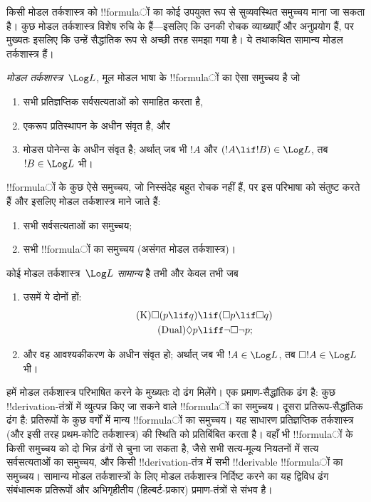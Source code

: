 \documentclass[../../../include/open-logic-section]{subfiles}
\begin{document}


किसी मोडल तर्कशास्त्र को !!{formula}ों का कोई उपयुक्त रूप से सुव्यवस्थित
समुच्चय माना जा सकता है। कुछ मोडल तर्कशास्त्र विशेष रुचि के हैं---इसलिए कि
उनकी रोचक व्याख्याएँ और अनुप्रयोग हैं, पर मुख्यतः इसलिए कि उन्हें सैद्धांतिक
रूप से अच्छी तरह समझा गया है। ये तथाकथित सामान्य मोडल तर्कशास्त्र हैं।

\begin{defn}
\emph{मोडल तर्कशास्त्र}~$\Log L$, मूल मोडल भाषा के !!{formula}ों का ऐसा
समुच्चय है जो
\begin{enumerate}
\item सभी प्रतिज्ञप्तिक सर्वसत्यताओं को समाहित करता है,
\item एकरूप प्रतिस्थापन के अधीन संवृत है, और
\item मोडस पोनेन्स के अधीन संवृत है; अर्थात् जब भी $!A$ और
  $(!A \lif !B) \in \Log L$, तब $!B \in \Log L$ भी।
\end{enumerate}
\end{defn}

\begin{ex}
!!{formula}ों के कुछ ऐसे समुच्चय, जो निस्संदेह बहुत रोचक नहीं हैं, पर इस
परिभाषा को संतुष्ट करते हैं और इसलिए मोडल तर्कशास्त्र माने जाते हैं:
\begin{enumerate}
\item सभी सर्वसत्यताओं का समुच्चय;
\item सभी !!{formula}ों का समुच्चय (असंगत मोडल तर्कशास्त्र)।
\end{enumerate}
\end{ex}

\begin{defn}\label{defn:normal-modal-logic}
कोई मोडल तर्कशास्त्र~$\Log L$ \emph{सामान्य} है तभी और केवल तभी जब
\begin{enumerate}
\item उसमें ये दोनों हों:
\begin{align}
\tag{K} \Box(p \lif q) & \lif (\Box p \lif \Box q) \\
\tag{Dual} \Diamond p & \liff \lnot \Box \lnot p;
\end{align}
\item और वह आवश्यकीकरण के अधीन संवृत हो; अर्थात् जब भी
  $!A \in \Log L$, तब $\Box !A \in \Log L$ भी।
\end{enumerate}
\end{defn}

हमें मोडल तर्कशास्त्र परिभाषित करने के मुख्यतः दो ढंग मिलेंगे। एक
प्रमाण-सैद्धांतिक ढंग है: कुछ !!{derivation}-तंत्रों में व्युत्पन्न किए जा
सकने वाले !!{formula}ों का समुच्चय। दूसरा प्रतिरूप-सैद्धांतिक ढंग है: प्रतिरूपों
के कुछ वर्गों में मान्य !!{formula}ों का समुच्चय। यह साधारण प्रतिज्ञप्तिक
तर्कशास्त्र (और इसी तरह प्रथम-कोटि तर्कशास्त्र) की स्थिति को प्रतिबिंबित करता
है। वहाँ भी !!{formula}ों के किसी समुच्चय को दो भिन्न ढंगों से चुना जा सकता
है, जैसे सभी सत्य-मूल्य नियतनों में सत्य सर्वसत्यताओं का समुच्चय, और किसी
!!{derivation}-तंत्र में सभी !!{derivable} !!{formula}ों का समुच्चय। सामान्य
मोडल तर्कशास्त्रों के लिए मोडल तर्कशास्त्र निर्दिष्ट करने का यह द्विविध ढंग
संबंधात्मक प्रतिरूपों और अभिगृहीतीय (हिल्बर्ट-प्रकार) प्रमाण-तंत्रों से संभव
है।
\end{document}
